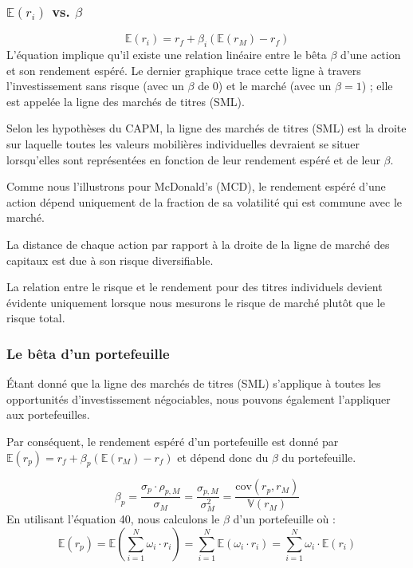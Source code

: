 \documentclass[a4paper, 12pt]{report}
\begin{document}
\subsubsection{\( \mathbb{E}(r_i) \) vs. \( \beta \)}

\[
\mathbb{E}(r_i) = r_f + \beta_i (\mathbb{E}(r_M) - r_f)
\]
L'équation implique qu'il existe une relation linéaire entre le bêta \( \beta \) d'une action et son rendement espéré. Le dernier graphique trace cette ligne à travers l'investissement sans risque (avec un \( \beta \) de 0) et le marché (avec un \( \beta = 1 \)) ; elle est appelée la ligne des marchés de titres (SML).

Selon les hypothèses du CAPM, la ligne des marchés de titres (SML) est la droite sur laquelle toutes les valeurs mobilières individuelles devraient se situer lorsqu'elles sont représentées en fonction de leur rendement espéré et de leur \( \beta \).

Comme nous l'illustrons pour McDonald's (MCD), le rendement espéré d'une action dépend uniquement de la fraction de sa volatilité qui est commune avec le marché.

La distance de chaque action par rapport à la droite de la ligne de marché des capitaux est due à son risque diversifiable.

La relation entre le risque et le rendement pour des titres individuels devient évidente uniquement lorsque nous mesurons le risque de marché plutôt que le risque total.

\subsubsection{Le bêta d'un portefeuille}

Étant donné que la ligne des marchés de titres (SML) s'applique à toutes les opportunités d'investissement négociables, nous pouvons également l'appliquer aux portefeuilles.

Par conséquent, le rendement espéré d'un portefeuille est donné par \( \mathbb{E}(r_p) = r_f + \beta_p (\mathbb{E}(r_M) - r_f) \) et dépend donc du \( \beta \) du portefeuille.

\[
\beta_p = \frac{\sigma_p \cdot \rho_{p,M}}{\sigma_M} = \frac{\sigma_{p,M}}{\sigma_M^2} = \frac{\text{cov}(r_p, r_M)}{\mathbb{V}(r_M)}
\]
En utilisant l'équation 40, nous calculons le \( \beta \) d'un portefeuille où :
\[
\mathbb{E}(r_p) = \mathbb{E}\left(\sum_{i=1}^{N} \omega_i \cdot r_i\right) = \sum_{i=1}^{N} \mathbb{E}(\omega_i \cdot r_i) = \sum_{i=1}^{N} \omega_i \cdot \mathbb{E}(r_i)
\]
\end{document}
